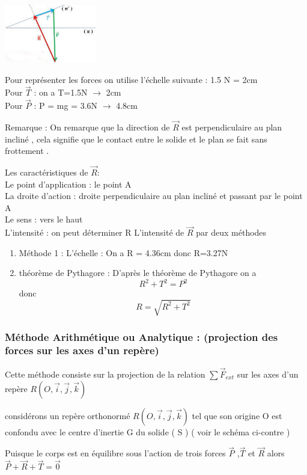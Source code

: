 \documentclass[12pt]{article}
\begin{document}
\begin{center}
\includegraphics[width=0.3\textwidth]{./img/img04.png}
\end{center}

Pour représenter les forces on utilise l’échelle suivante : 1.5 N = 2cm
\\Pour $\vec{T}$ : on a  T=1.5N $\rightarrow$ 2cm
\\Pour $\vec{P}$ : P = mg = 3.6N $\rightarrow$ 4.8cm

Remarque : On remarque que la direction de $\vec{R}$ est perpendiculaire au plan incliné  , cela signifie que le contact entre le solide et le plan se fait sans frottement .

Les caractéristiques de $\vec{R} : $
\\Le point d’application : le point A
\\La droite d’action : droite perpendiculaire au plan incliné et passant par le point A
\\Le sens : vers le haut
\\L’intensité : on peut déterminer R L’intensité de $\vec{R}$ par deux méthodes 
\begin{enumerate}
  \item Méthode 1 : L’échelle : On a R = 4.36cm donc R=3.27N
  \item théorème de Pythagore : D’après le théorème de Pythagore on a  $$R^2 + T^2 = P^2$$
    donc $$R = \sqrt{R^2 + T^2}$$
\end{enumerate}

\subsubsection{Méthode Arithmétique ou Analytique : (projection des forces sur les axes d’un repère)}

Cette méthode consiste sur la projection de la relation $\sum{\vec{F}_{ext}}$ sur les axes d’un repère $ R(O, \vec{i}, \vec{j}, \vec{k})$

considérons un repère orthonormé $ R(O, \vec{i}, \vec{j}, \vec{k})$ tel que son origine O est confondu avec le centre d’inertie G
du solide ( S ) ( voir le schéma ci-contre )

Puisque le corps est en équilibre sous l’action de trois forces $\vec{P}$ ,$\vec{T}$ et $\vec{R}$ 
alors  $\vec{P} + \vec{R} + \vec{T} = \vec{0}$
\end{document}
